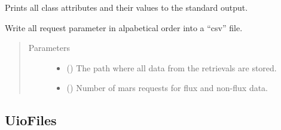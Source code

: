 \documentclass[letterpaper,10pt,english]{sphinxmanual}
\begin{document}
\begin{fulllineitems}
\begin{fulllineitems}
\end{fulllineitems}


\begin{fulllineitems}
\label{\detokenize{api:MarsRetrieval.MarsRetrieval.display_info}}
Prints all class attributes and their values to the
standard output.

\end{fulllineitems}


\begin{fulllineitems}
\label{\detokenize{api:MarsRetrieval.MarsRetrieval.print_infodata_csv}}
Write all request parameter in alpabetical order into a “csv” file.
\begin{quote}\begin{description}
\item[{Parameters}] \leavevmode\begin{itemize}
\item {} 
 () \textendash{} The path where all data from the retrievals are stored.

\item {} 
 () \textendash{} Number of mars requests for flux and non-flux data.

\end{itemize}

\end{description}\end{quote}

\end{fulllineitems}


\end{fulllineitems}



\subsection{UioFiles}
\label{\detokenize{api:uiofiles}}
\end{document}

